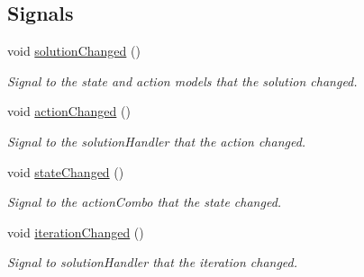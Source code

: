 \subsection*{Signals}
\begin{DoxyCompactItemize}
\item 
\mbox{\label{classSGPlotController__V2_add52b2f05d4adff7f1d02faf3e6588fb}} 
void \hyperlink{classSGPlotController__V2_add52b2f05d4adff7f1d02faf3e6588fb}{solution\+Changed} ()
\begin{DoxyCompactList}\small\item\em Signal to the state and action models that the solution changed. \end{DoxyCompactList}\item 
\mbox{\label{classSGPlotController__V2_a4a6d19fa34127439f4997f379abd9604}} 
void \hyperlink{classSGPlotController__V2_a4a6d19fa34127439f4997f379abd9604}{action\+Changed} ()
\begin{DoxyCompactList}\small\item\em Signal to the solution\+Handler that the action changed. \end{DoxyCompactList}\item 
\mbox{\label{classSGPlotController__V2_ad0b30bfba68303c2a4252de98ecb6d8e}} 
void \hyperlink{classSGPlotController__V2_ad0b30bfba68303c2a4252de98ecb6d8e}{state\+Changed} ()
\begin{DoxyCompactList}\small\item\em Signal to the action\+Combo that the state changed. \end{DoxyCompactList}\item 
\mbox{\label{classSGPlotController__V2_a1ab601bb4a50d7a15dbda5de0d577ca0}} 
void \hyperlink{classSGPlotController__V2_a1ab601bb4a50d7a15dbda5de0d577ca0}{iteration\+Changed} ()
\begin{DoxyCompactList}\small\item\em Signal to solution\+Handler that the iteration changed. \end{DoxyCompactList}\end{DoxyCompactItemize}
